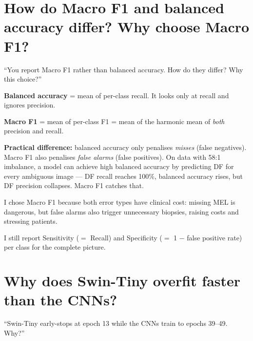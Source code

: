 \documentclass[11pt,a4paper]{article}
\begin{document}
\section{How do Macro F1 and balanced accuracy differ? Why choose Macro F1?}

\begin{question}
``You report Macro F1 rather than balanced accuracy. How do they differ? Why this choice?''
\end{question}

\begin{answer}
\textbf{Balanced accuracy} = mean of per-class recall. It looks only at recall and ignores precision.

\textbf{Macro F1} = mean of per-class F1 = mean of the harmonic mean of \textit{both} precision and recall.

\textbf{Practical difference:} balanced accuracy only penalises \textit{misses} (false negatives). Macro F1 also penalises \textit{false alarms} (false positives). On data with 58:1 imbalance, a model can achieve high balanced accuracy by predicting DF for every ambiguous image --- DF recall reaches 100\%, balanced accuracy rises, but DF precision collapses. Macro F1 catches that.

I chose Macro F1 because both error types have clinical cost: missing MEL is dangerous, but false alarms also trigger unnecessary biopsies, raising costs and stressing patients.

I still report Sensitivity ($=$ Recall) and Specificity ($=$ 1 $-$ false positive rate) per class for the complete picture.
\end{answer}

\section{Why does Swin-Tiny overfit faster than the CNNs?}

\begin{question}
``Swin-Tiny early-stops at epoch 13 while the CNNs train to epochs 39--49. Why?''
\end{question}
\end{document}
